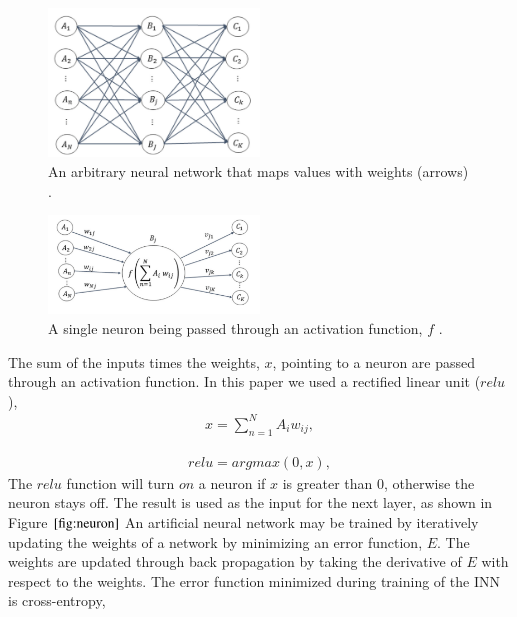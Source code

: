 \documentclass[fleqn]{anstrans}
\begin{document}
\begin{figure}[ht]
\centering
\includegraphics[width=0.5\textwidth]{../figures/dense-layer-figure.png}
\caption{An arbitrary neural network that maps values with weights (arrows) \cite{kamudaComparisonMachineLearning2018a}.}
\label{fig:dense-nn}
\end{figure}
\begin{figure}[ht]
\centering
\includegraphics[width=0.5\textwidth]{../figures/neuron-figure.png}
\caption{A single neuron being passed through an activation function, $\textit{f}$ \cite{kamudaComparisonMachineLearning2018a}.}
\label{fig:neuron}
\end{figure}

The sum of the inputs times the weights, $x$, pointing to a neuron are passed through an activation function.
In this paper we used a rectified linear unit ($\textit{relu}$),
\begin{equation}
	\begin{aligned}
		x = \sum_{n=1}^{N}A_i w_{ij},
	\end{aligned}
\end{equation}  

\begin{equation}
	\begin{aligned}
		relu = argmax(0, x),
	\end{aligned}
\end{equation}
The $\textit{relu}$ function will turn $on$ a neuron if $x$ is greater than 0, otherwise the neuron stays off.
The result is used as the input for the next layer, as shown in Figure $\ref{fig:neuron}$ 
An artificial neural network may be trained by iteratively updating the weights of a network by minimizing an error function, $E$. 
The weights are updated through back propagation by taking the derivative of $E$ with respect to the weights. 
The error function minimized during training of the INN is cross-entropy,
\end{document}
